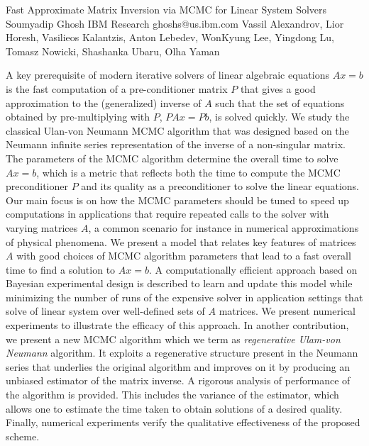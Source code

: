 \begin{talk}
  {Fast Approximate Matrix Inversion via MCMC for Linear System Solvers}%
  {Soumyadip Ghosh}%
  {IBM Research}%
  {ghoshs@us.ibm.com}%
  {Vassil Alexandrov, Lior Horesh, Vasilieos Kalantzis, Anton Lebedev,  WonKyung Lee, Yingdong Lu, Tomasz Nowicki, Shashanka Ubaru, Olha Yaman}%
  
    
   
A key prerequisite of modern iterative solvers of linear algebraic equations $Ax=b$ is the fast computation of a pre-conditioner matrix $P$ that gives a good approximation to the (generalized) inverse of $A$ such that the set of equations obtained by pre-multiplying with $P$, $PAx=Pb$, is solved quickly. 
We study the classical Ulan-von Neumann MCMC algorithm that was designed based on the Neumann infinite series representation of the inverse of a non-singular matrix. The parameters of the MCMC algorithm determine the overall time to solve $Ax=b$, which is a metric that 
reflects both the time to compute the MCMC preconditioner $P$ and its quality as a preconditioner to solve the linear equations. Our main focus is on how the MCMC parameters should be tuned to speed up computations in applications that require repeated calls to the solver with varying matrices $A$, a common scenario for instance in numerical approximations of physical phenomena. 
We present a model that relates key features of matrices $A$ with good choices of MCMC algorithm parameters that lead to a fast overall time to find a solution to $Ax=b$. A computationally efficient approach based on Bayesian experimental design is described to learn and update this model while minimizing the number of runs of the expensive solver in application settings that solve of linear system over well-defined sets of $A$ matrices. We present numerical experiments to illustrate the efficacy of this approach.
In another contribution, we present a new MCMC algorithm which we term as \emph{regenerative Ulam-von Neumann} algorithm. It exploits a regenerative structure present in the Neumann series that underlies the original algorithm and improves on it by producing an unbiased estimator of the matrix inverse. A rigorous analysis of performance of the algorithm is provided. This includes the variance of the estimator, which allows one to estimate the time taken to obtain solutions of a desired quality. Finally, numerical experiments verify the qualitative effectiveness of the proposed scheme. 

\end{talk}

